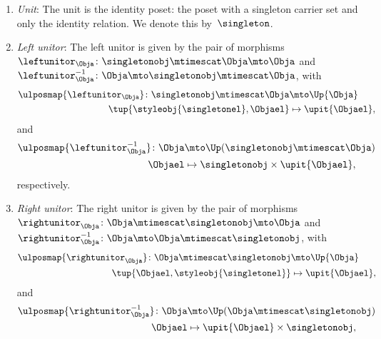 \begin{lemma}
\begin{enumerate}
    \item \emph{Unit}: The unit is the identity poset: the poset with a singleton carrier set and only the identity relation.
    We denote this by~$\singleton$.
    \item \emph{Left unitor}: The left unitor is given by the pair of morphisms~$\leftunitor_\Obja\colon \singletonobj\mtimescat \Obja \mto \Obja$ and~$\leftunitor_\Obja^{-1}\colon \Obja \mto \singletonobj\mtimescat \Obja$, with
    \begin{equation}
        \begin{aligned}
            \ulposmap{\leftunitor_\Obja}\colon \singletonobj\mtimescat \Obja &\mto \Up{\Obja}\\
            \tup{\styleobj{\singletonel},\Objael}&\mapsto \upit\{\Objael\},
        \end{aligned}
    \end{equation}
    and
    \begin{equation}
        \begin{aligned}
            \ulposmap{\leftunitor_\Obja^{-1}}\colon \Obja &\mto \Up(\singletonobj\mtimescat \Obja) \\
            \Objael&\mapsto \singletonobj \times \upit \{\Objael\},
        \end{aligned}
    \end{equation}
    respectively.
    \item \emph{Right unitor}: The right unitor is given by the pair of morphisms~$\rightunitor_\Obja\colon \Obja\mtimescat \singletonobj  \mto \Obja$ and~$\rightunitor_\Obja^{-1}\colon \Obja \mto \Obja \mtimescat \singletonobj$, with
    \begin{equation}
        \begin{aligned}
            \ulposmap{\rightunitor_\Obja}\colon \Obja\mtimescat \singletonobj  &\mto \Up{\Obja}\\
            \tup{\Objael,\styleobj{\singletonel}}&\mapsto \upit\{\Objael\},
        \end{aligned}
    \end{equation}
    and
    \begin{equation}
        \begin{aligned}
            \ulposmap{\rightunitor_\Obja^{-1}}\colon \Obja &\mto \Up( \Obja \mtimescat \singletonobj) \\
            \Objael&\mapsto \upit \{\Objael\} \times \singletonobj,
        \end{aligned}
    \end{equation}

\end{enumerate}
\end{lemma}
